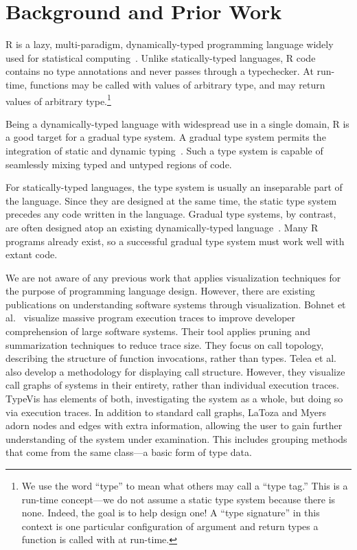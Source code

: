 \documentclass{vgtc}                          %
\newcommand{\typevis}{{\sc TypeVis}\xspace}
\begin{document}

\section{Background and Prior Work}

R is a lazy, multi-paradigm, dynamically-typed programming language
widely used for statistical computing~\cite{morandat:2012}.
Unlike statically-typed languages,
R code contains no type annotations
and never passes through a typechecker.
At run-time,
functions may be called with values of arbitrary type,
and may return values of arbitrary type.\footnote{
  We use the word ``type'' to mean what others may call a ``type tag.''
  This is a run-time concept---we do not assume a static type system
  because there is none. Indeed, the goal is to help design one!
  A ``type signature'' in this context is one particular configuration
  of argument and return types a function is called with at run-time.
}

Being a dynamically-typed language
with widespread use in a single domain,
R is a good target for a gradual type system.
A gradual type system permits the integration of
static and dynamic typing~\cite{siek:2006,tobin-hochstadt:2006}.
Such a type system is capable of seamlessly mixing typed and untyped regions of code.

For statically-typed languages, the type system is usually
an inseparable part of the language. Since they are designed
at the same time, the static type system precedes any code written
in the language.
Gradual type systems, by contrast, are often designed atop
an existing dynamically-typed language~\cite{tobin-hochstadt:2016}.
Many R programs already exist,
so a successful gradual type system must
work well with extant code.

We are not aware of any previous work that applies
visualization techniques for the purpose of programming language design.
However, there are existing publications on understanding
software systems through visualization.
Bohnet et al.~\cite{bohnet:2009} visualize massive program execution traces
to improve developer comprehension of large software systems.
Their tool applies pruning and summarization techniques to reduce trace size.
They focus on call topology,
describing the structure of function invocations,
rather than types.
Telea et al.~\cite{telea:2009} also develop a methodology for displaying call structure.
However, they visualize call graphs of systems in their entirety,
rather than individual execution traces.
\typevis has elements of both,
investigating the system as a whole,
but doing so via execution traces.
In addition to standard call graphs,
LaToza and Myers~\cite{latoza:2011} adorn nodes and edges with extra information,
allowing the user to gain further understanding of the system
under examination.
This includes grouping methods that come from the same class---a
basic form of type data.
\end{document}
